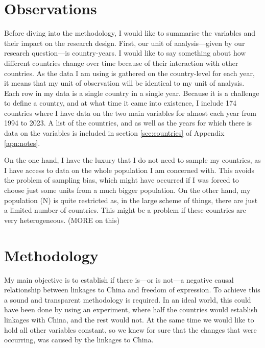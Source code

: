 \section{Observations}
Before diving into the methodology, I would like to summarise the variables and their impact on the research design. First, our unit of analysis---given by our research question---is country-years. I would like to say something about how different countries change over time because of their interaction with other countries. As the data I am using is gathered on the country-level for each year, it means that my unit of observation will be identical to my unit of analysis. Each row in my data is a single country in a single year. Because it is a challenge to define a country, and at what time it came into existence, I include 174 countries where I have data on the two main variables for almost each year from 1994 to 2023. A list of the countries, and as well as the years for which there is data on the variables is included in section \ref{sec:countries} of Appendix \ref{apn:notes}. 

On the one hand, I have the luxury that I do not need to sample my countries, as I have access to data on the whole population I am concerned with. This avoids the problem of sampling bias, which might have occurred if I was forced to choose just some units from a much bigger population. On the other hand, my population (N) is quite restricted as, in the large scheme of things, there are just a limited number of countries. This might be a problem if these countries are very heterogeneous. (MORE on this)

\section{Methodology}
My main objective is to establish if there is---or is not---a negative causal relationship between linkages to China and freedom of expression. To achieve this a sound and transparent methodology is required. In an ideal world, this could have been done by using an experiment, where half the countries would establish linkages with China, and the rest would not. At the same time we would like to hold all other variables constant, so we knew for sure that the changes that were occurring, was caused by the linkages to China.


